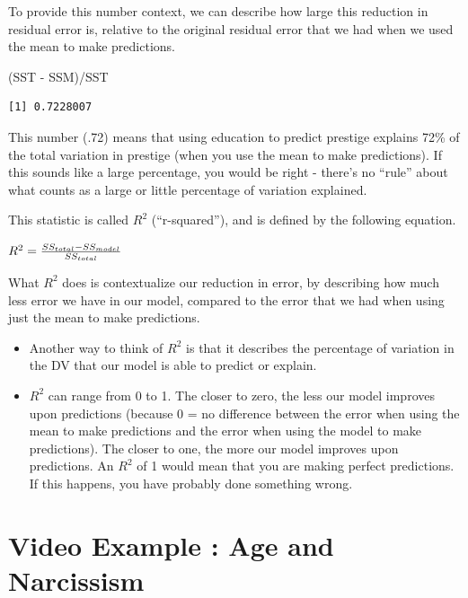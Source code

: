 \documentclass[
  letterpaper,
  DIV=11,
  numbers=noendperiod,
  oneside]{scrreprt}
\newenvironment{Shaded}{\begin{snugshade}}{\end{snugshade}}
\newcommand{\NormalTok}[1]{\textcolor[rgb]{0.00,0.23,0.31}{#1}}
\newcommand{\SpecialCharTok}[1]{\textcolor[rgb]{0.37,0.37,0.37}{#1}}
\begin{document}
To provide this number context, we can describe how large this reduction
in residual error is, relative to the original residual error that we
had when we used the mean to make predictions.

\begin{Shaded}
\begin{Highlighting}[]
\NormalTok{(SST }\SpecialCharTok{{-}}\NormalTok{ SSM)}\SpecialCharTok{/}\NormalTok{SST}
\end{Highlighting}
\end{Shaded}

\begin{verbatim}
[1] 0.7228007
\end{verbatim}

This number (.72) means that using education to predict prestige
explains 72\% of the total variation in prestige (when you use the mean
to make predictions). If this sounds like a large percentage, you would
be right - there's no ``rule'' about what counts as a large or little
percentage of variation explained.

This statistic is called \(R^2\) (``r-squared''), and is defined by the
following equation.

\(\Huge R^2 = \frac{SS_{total} - SS_{model}}{SS_{total}}\)

What \(R^2\) does is contextualize our reduction in error, by describing
how much less error we have in our model, compared to the error that we
had when using just the mean to make predictions.

\begin{itemize}
\item
  Another way to think of \(R^2\) is that it describes the percentage of
  variation in the DV that our model is able to predict or explain.
\item
  \(R^2\) can range from 0 to 1. The closer to zero, the less our model
  improves upon predictions (because 0 = no difference between the error
  when using the mean to make predictions and the error when using the
  model to make predictions). The closer to one, the more our model
  improves upon predictions. An \(R^2\) of 1 would mean that you are
  making perfect predictions. If this happens, you have probably done
  something wrong.
\end{itemize}

\section{Video Example : Age and
Narcissism}\label{video-example-age-and-narcissism}
\end{document}
